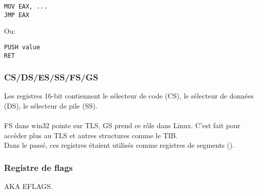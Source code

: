 \begin{lstlisting}
MOV EAX, ...
JMP EAX
\end{lstlisting}

Ou:

\begin{lstlisting}
PUSH value
RET
\end{lstlisting}

\subsubsection{CS/DS/ES/SS/FS/GS}

Les registres 16-bit contiennent le sélecteur de code (CS), le sélecteur de données
(DS), le sélecteur de pile (SS).\\
\\
FS dans win32 pointe sur \ac{TLS}, GS prend ce rôle dans Linux.
C'est fait pour accèder plus au \ac{TLS} et autres structures comme le \ac{TIB}.
\\
Dans le passé, ces registres étaient utilisés comme registres de segments ().

\subsubsection{Registre de flags}
\label{EFLAGS}
\ac{AKA} EFLAGS.

